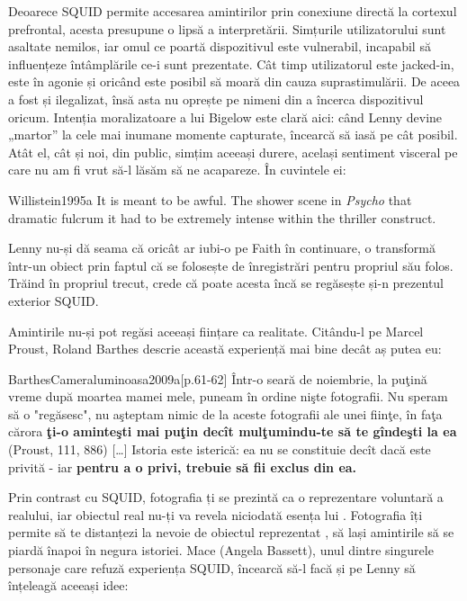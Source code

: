 \documentclass[12pt]{article}
\begin{document}
Deoarece SQUID permite accesarea amintirilor prin conexiune directă la cortexul prefrontal, acesta presupune o lipsă a interpretării. Simțurile utilizatorului sunt asaltate nemilos, iar omul ce poartă dispozitivul este vulnerabil, incapabil să influențeze întâmplările ce-i sunt prezentate. Cât timp utilizatorul este jacked-in, este în agonie și oricând este posibil să moară din cauza suprastimulării. De aceea a fost și ilegalizat, însă asta nu oprește pe nimeni din a încerca dispozitivul oricum. Intenția moralizatoare a lui Bigelow este clară aici: când Lenny devine „martor” la cele mai inumane momente capturate, încearcă să iasă pe cât posibil. Atât el, cât și noi, din public, simțim aceeași durere, același sentiment visceral pe care nu am fi vrut să-l lăsăm să ne acapareze. În cuvintele ei:\par

\begin{displaycquote}{Willistein1995a}
	It is meant to be awful. The shower scene in \textit{Psycho} \textemdash that dramatic fulcrum \textemdash it had to be extremely intense within the thriller construct.
\end{displaycquote}

Lenny nu-și dă seama că oricât ar iubi-o pe Faith în continuare, o transformă într-un obiect prin faptul că se folosește de înregistrări pentru propriul său folos. Trăind în propriul trecut, crede că poate acesta încă se regăsește și-n prezentul exterior SQUID.\par

Amintirile nu-și pot regăsi aceeași ființare ca realitate. Citându-l pe Marcel Proust, Roland Barthes descrie această experiență mai bine decât aș putea eu:

\begin{displaycquote}{BarthesCameraluminoasa2009a}[p.61-62]
		Într-o seară de noiembrie, la puţină vreme după moartea mamei mele, puneam în ordine nişte fotografii. Nu speram să o "regăsesc", nu aşteptam nimic de la \guillemetleft aceste fotografii ale unei fiinţe, în faţa cărora \textbf{ţi-o aminteşti mai puţin decît mulţumindu-te să te gîndeşti la ea}\guillemetright\: (Proust, 111, 886) […] Istoria este isteri­că: ea nu se constituie decît dacă este privită - iar \textbf{pentru a o privi, trebuie să fii exclus din ea.}
\end{displaycquote}

Prin contrast cu SQUID, fotografia ți se prezintă ca o reprezentare voluntară a realului, iar obiectul real nu-ți va revela niciodată esența lui \cite{BarthesCameraluminoasa2009a}. Fotografia îți permite să te distanțezi la nevoie de obiectul reprezentat \cite{secSontagPlatosCavea}, să lași amintirile să se piardă înapoi în negura istoriei. Mace (Angela Bassett), unul dintre singurele personaje care refuză experiența SQUID, încearcă să-l facă și pe Lenny să înțeleagă aceeași idee:\par
\end{document}
